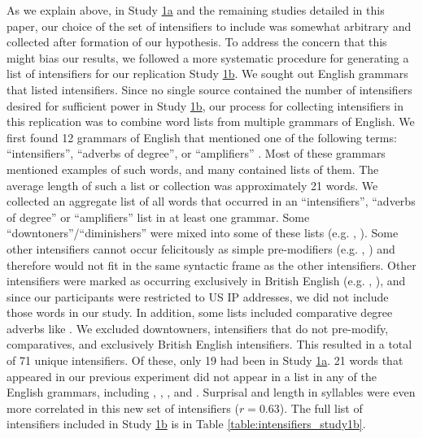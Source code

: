 As we explain above, in Study \hyperref[sec:study1a]{1a} and the remaining studies detailed in this paper, our choice of the set of intensifiers to include was somewhat arbitrary and collected after formation of our hypothesis.
To address the concern that this might bias our results, we followed a more systematic procedure for generating a list of intensifiers for our replication Study \hyperref[sec:study1b]{1b}.
We sought out English grammars that listed intensifiers.
Since no single source contained the number of intensifiers desired for sufficient power in Study \hyperref[sec:study1b]{1b}, our process for collecting intensifiers in this replication was to combine word lists from multiple grammars of English.
We first found 12 grammars of English that mentioned one of the following terms: ``intensifiers'', ``adverbs of degree'', or ``amplifiers'' \cite{aarts_oxford_2014,douglas_longman_2000,declerck_comprehensive_1991,garner_chicago_2016,givon_english_1993,greenbaum_oxford_1996,huddleston_cambridge_2002,huddleston_introduction_1984,nelson_english:_2010,quirk_grammar_1972,quirk_students_1990,van_gelderen_introduction_2010}.
Most of these grammars mentioned examples of such words, and many contained lists of them.
The average length of such a list or collection was approximately 21 words.
We collected an aggregate list of all words that occurred in an ``intensifiers'', ``adverbs of degree'' or ``amplifiers'' list in at least one grammar.
Some ``downtoners''/``diminishers'' were mixed into some of these lists (e.g. , ).
Some other intensifiers cannot occur felicitously as simple pre-modifiers (e.g. , ) and therefore would not fit in the same syntactic frame as the other intensifiers.
Other intensifiers were marked as occurring exclusively in British English (e.g. , ), and since our participants were restricted to US IP addresses, we did not include those words in our study.
In addition, some lists included comparative degree adverbs like .
We excluded downtowners, intensifiers that do not pre-modify, comparatives, and exclusively British English intensifiers.
This resulted in a total of 71 unique intensifiers.
Of these, only 19 had been in Study \hyperref[sec:study1a]{1a}.
21 words that appeared in our previous experiment did not appear in a list in any of the English grammars, including , , , and .
Surprisal and length in syllables were even more correlated in this new set of intensifiers ($r=0.63$).
The full list of intensifiers included in Study \hyperref[sec:study1b]{1b} is in Table \hyperref[table:intensifiers_study1a]{\ref{table:intensifiers_study1b}}.

